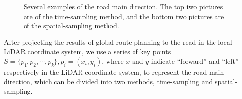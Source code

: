 \documentclass[letterpaper,10 pt,conference]{ieeeconf}  %
\begin{document}
\begin{figure}
{    }
    \quad
    \quad
    \caption{Several examples of the road main direction. The top two pictures are of the time-sampling method, and the bottom two pictures are of the  spatial-sampling method.}
    \label{representation}
\end{figure}
After projecting the results of global route planning to the road in the local LiDAR coordinate system, we use a series of key points $S=\{ p_1, p_2, \cdots , p_k\}, p_i=(x_i, y_i)$, where $x$ and $y$ indicate ``forward'' and ``left'' respectively in the LiDAR coordinate system, to represent the road main direction, which can be divided into two methods, time-sampling and spatial-sampling.
\end{document}
